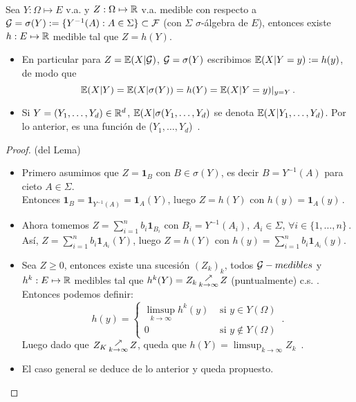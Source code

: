 \vspace{.5cm}\\
\begin{lemma}
Sea $Y:\Omega\mapsto E$ v.a. y $Z:\Omega\mapsto \mathbb{R}$ v.a. medible con respecto a $\mathcal{G}=\sigma(Y):=\{Y^{-1}(A):A\in \Sigma \}\subset \mathcal{F}$ (con $\Sigma$ $\sigma$-álgebra de $E$), entonces existe $h:E\mapsto \mathbb{R}$ medible tal que $Z=h(Y)$.
\end{lemma}
\begin{remark}
\beforeitemize
\begin{itemize}
    \item En particular para $Z=\mathbb{E}(X|\mathcal{G})$, $\mathcal{G}=\sigma(Y)$ escribimos $\mathbb{E}(X|Y=y):=h(y)$, de modo que
    $$ \mathbb{E}(X|Y) = \mathbb{E}(X|\sigma(Y)) = h(Y) = \mathbb{E}(X|Y=y)|_{y=Y} \, .$$
    \item Si $Y=(Y_1,\dots,Y_d)\in\mathbb{R}^d$, $\mathbb{E}(X|\sigma(Y_1,\dots,Y_d)$ se denota $\mathbb{E}(X|Y_1,\dots,Y_d)$. Por lo anterior, es una función de ($Y_1,\dots,Y_d$)\, .
\end{itemize}
\end{remark}
\begin{proof}
(del Lema)

\begin{itemize} \gris
    \item Primero asumimos que $Z=\mathbf{1}_B$ con $B\in\sigma(Y)$, es decir $B=Y^{-1}(A)$ para cieto  $A\in\Sigma$. \\ Entonces $\mathbf{1}_B=\mathbf{1}_{Y^{-1}(A)}=\mathbf{1}_A(Y)$, luego $Z=h(Y)$ con $h(y)=\mathbf{1}_A(y) \, .$
    \item Ahora tomemos $Z=\displaystyle \sum^n_{i=1}b_i\mathbf{1}_{B_i}$ con $B_i=Y^{-1}(A_i)$, $A_i\in\Sigma$, $\forall i\in\{1,\dots,n\} \, .$
    \\ As\'i,  $Z=\displaystyle \sum^n_{i=1}b_i\mathbf{1}_{A_i}(Y)$, luego $Z=h(Y)$ con $h(y)=\displaystyle\sum^n_{i=1}b_i\mathbf{1}_{A_i}(y)$.
    \item Sea $Z\geq 0$, entonces existe una sucesión $(Z_k)_k$, todos $\mathcal{G}-medibles$ y $h^k:E\mapsto\mathbb{R}$ medibles tal que $h^k(Y)=Z_k \displaystyle \,\substack{\nearrow \\ \tiny{k\to\infty}}\, Z$ (puntualmente) c.s. . Entonces podemos definir:
    $$ h(y) = \begin{cases} \displaystyle\limsup_{k\to \infty}h^k(y)  & \mbox{ si }y\in Y(\Omega)\\
                            0 & \mbox{ si }y\notin Y(\Omega)  \end{cases} \, .$$
    Luego dado que $Z_K \,\substack{\nearrow \\ \tiny{k\to\infty}}\, Z$, queda que $h(Y)=\displaystyle\limsup_{k\to \infty}Z_k$\, . %
    \item El caso general se deduce de lo anterior y  queda propuesto.  
\end{itemize}\findem \negro
\end{proof}
